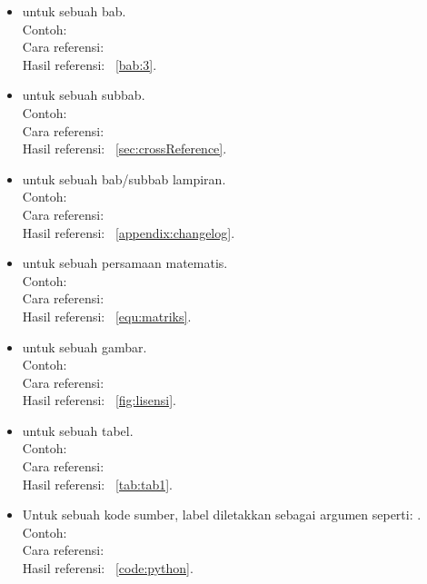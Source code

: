 \begin{itemize}
	\item {} untuk sebuah bab. \\
	Contoh:  \\
	Cara referensi:  \\
	Hasil referensi: \bab~\ref{bab:3}.
	\item {} untuk sebuah subbab. \\
	Contoh:  \\
	Cara referensi:  \\
	Hasil referensi: \sect~\ref{sec:crossReference}.
	\item {} untuk sebuah bab/subbab lampiran. \\
	Contoh:  \\
	Cara referensi:  \\	Hasil referensi: \apdx~\ref{appendix:changelog}.
	\item {} untuk sebuah persamaan matematis. \\
	Contoh:  \\
	Cara referensi:  \\
	Hasil referensi: \equ~\ref{equ:matriks}.
	\item {} untuk sebuah gambar. \\
	Contoh:  \\
	Cara referensi:  \\
	Hasil referensi: \pic~\ref{fig:lisensi}.
	\item {} untuk sebuah tabel. \\
	Contoh:  \\
	Cara referensi:  \\
	Hasil referensi: \tab~\ref{tab:tab1}.
	\item Untuk sebuah kode sumber, label diletakkan sebagai argumen  seperti: . \\
	Contoh:  \\
	Cara referensi:  \\
	Hasil referensi: \lst~\ref{code:python}.
\end{itemize}


